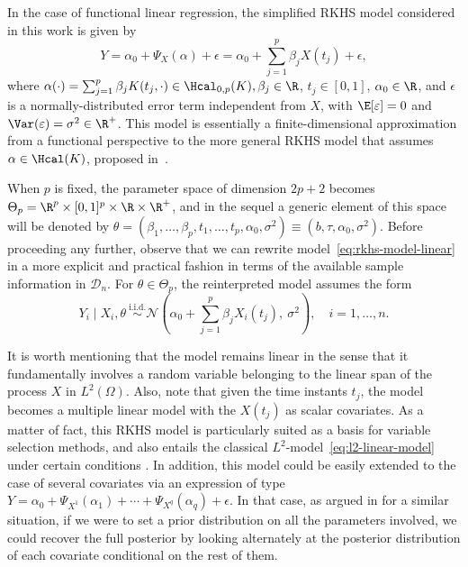 In the case of functional linear regression, the simplified RKHS model considered in this work is given by
\begin{equation}\label{eq:rkhs-model-linear}
  Y = \alpha_0 + \Psi_X(\alpha) + \epsilon = \alpha_0 + \sum_{j=1}^p \beta_j X(t_j) + \epsilon,
\end{equation}
where \(\alpha(\cdot)=\sum_{j=1}^p\beta_jK(t_j, \cdot) \in \Hcal_{0,p}(K), \beta_j \in \R\), \(t_j \in [0, 1]\), \(\alpha_0\in\R\), and \(\epsilon\) is a normally-distributed error term independent from \(X\), with \(\E[\epsilon]=0\) and \(\Var(\epsilon)=\sigma^2\in \R^+\). This model is essentially a finite-dimensional approximation from a functional perspective to the more general RKHS model that assumes \(\alpha \in \Hcal(K)\), proposed in~\citet{berrendero2019rkhs}.

When \(p\) is fixed, the parameter space of dimension \(2p + 2\) becomes \(\Theta_p = \R^p \times [0, 1]^p \times \R \times \R^+\), and in the sequel a generic element of this space will be denoted by \(\theta = (\beta_1,\dots, \beta_p, t_1,\dots, t_p, \alpha_0, \sigma^2) \equiv (b, \tau, \alpha_0, \sigma^2)\). Before proceeding any further, observe that we can rewrite model~\eqref{eq:rkhs-model-linear} in a more explicit and practical fashion in terms of the available sample information in \(\mathcal D_n\). For \(\theta \in \Theta_p\), the reinterpreted model assumes the form
\begin{equation}\label{eq:rkhs-model-linear-2}
  Y_i \mid X_i, \theta \ \stackrel{\text{i.i.d.}}{\sim} \mathcal N\left(\alpha_0 + \sum_{j=1}^p \beta_j X_i(t_j), \ \sigma^2\right), \quad i =1,\dots, n.
\end{equation}

It is worth mentioning that the model remains linear in the sense that it fundamentally involves a random variable belonging to the linear span of the process \(X\) in \(L^2(\Omega)\). Also, note that given the time instants \(t_j\), the model becomes a multiple linear model with the \(X(t_j)\) as scalar covariates. As a matter of fact, this RKHS model is particularly suited as a basis for variable selection methods, and also entails the classical \(L^2\)-model~\eqref{eq:l2-linear-model} under certain conditions \citep[see][Sec.~3]{berrendero2020general}. In addition, this model could be easily extended to the case of several covariates via an expression of type \(Y=\alpha_0 + \Psi_{X^{1}}(\alpha_1) + \cdots + \Psi_{X^{q}}(\alpha_q) + \epsilon\). In that case, as argued in \citet{grollemund2019bayesian} for a similar situation, if we were to set a prior distribution on all the parameters involved, we could recover the full posterior by looking alternately at the posterior distribution of each covariate conditional on the rest of them.

